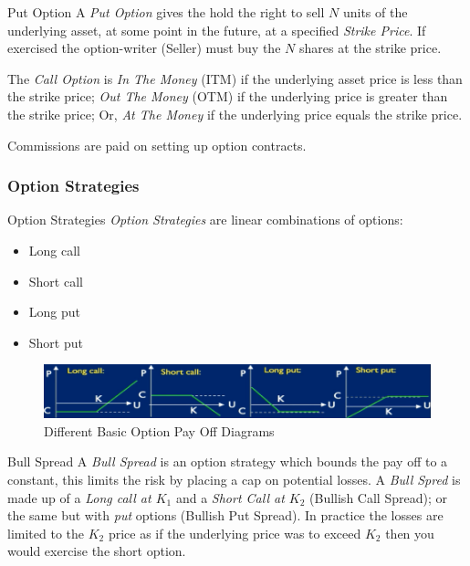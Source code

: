 \documentclass[11pt,a4paper]{article}
\begin{document}
  \begin{definition}{Put Option}
    A \textit{Put Option} gives the hold the right to sell $N$ units of the underlying asset, at some point in the future, at a specified \textit{Strike Price}. If exercised the option-writer (Seller) must buy the $N$ shares at the strike price.
    \par The \textit{Call Option} is \textit{In The Money} (ITM) if the underlying asset price is less than the strike price; \textit{Out The Money} (OTM) if the underlying price is greater than the strike price; Or, \textit{At The Money} if the underlying price equals the strike price.
  \end{definition}

  \begin{remark}{Commissions are paid on setting up option contracts.}

  \end{remark}

\subsubsection{Option Strategies}

  \begin{proposition}{Option Strategies}
    \textit{Option Strategies} are linear combinations of options:
    \begin{itemize}
      \item Long call
      \item Short call
      \item Long put
      \item Short put
    \end{itemize}
  \end{proposition}

  \begin{figure}[ht!]
    \centering
    \includegraphics[width=.5\textwidth]{options.PNG}
    \caption{Different Basic Option Pay Off Diagrams}
  \end{figure}

  \begin{definition}{Bull Spread}
    A \textit{Bull Spread} is an option strategy which bounds the pay off to a constant, this limits the risk by placing a cap on potential losses. A \textit{Bull Spred} is made up of a \textit{Long call at $K_1$} and a \textit{Short Call at $K_2$} (Bullish Call Spread); or the same but with \textit{put} options (Bullish Put Spread). In practice the losses are limited to the $K_2$ price as if the underlying price was to exceed $K_2$ then you would exercise the short option.
  \end{definition}
\end{document}
